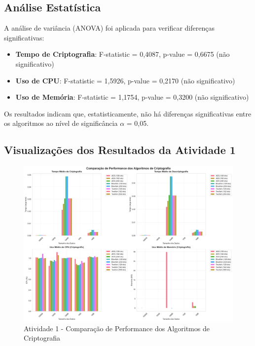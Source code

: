 \documentclass[12pt,a4paper,oneside]{article}
\begin{document}
\subsection{Análise Estatística}

A análise de variância (ANOVA) foi aplicada para verificar diferenças significativas:

\begin{itemize}
    \item \textbf{Tempo de Criptografia}: F-statistic = 0,4087, p-value = 0,6675 (não significativo)
    \item \textbf{Uso de CPU}: F-statistic = 1,5926, p-value = 0,2170 (não significativo)
    \item \textbf{Uso de Memória}: F-statistic = 1,1754, p-value = 0,3200 (não significativo)
\end{itemize}

Os resultados indicam que, estatisticamente, não há diferenças significativas entre os algoritmos ao nível de significância $\alpha$ = 0,05.

\subsection{Visualizações dos Resultados da Atividade 1}

\begin{figure}[H]
\centering
\includegraphics[width=\textwidth]{atividade1/results/performance_comparison.png}
\caption{Atividade 1 - Comparação de Performance dos Algoritmos de Criptografia}
\label{fig:performance1}
\end{figure}
\end{document}
